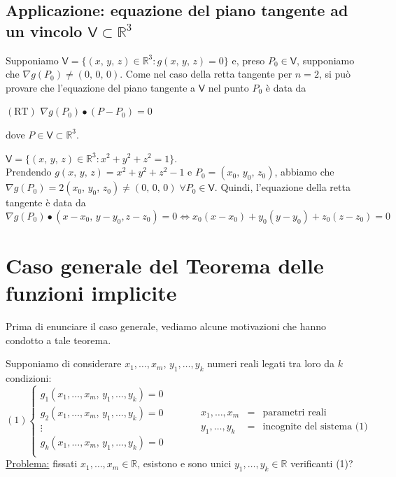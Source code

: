 \subsection{Applicazione: equazione del piano tangente ad un vincolo $\mathsf{V} \subset \mathbb{R}^3$}
Supponiamo $\mathsf{V} = \lbrace (x,\,y,\,z) \in \mathbb{R}^3 : g(x,\,y,\,z) = 0 \rbrace$ e, preso $P_0 \in \mathsf{V}$, supponiamo che $\nabla g(P_0) \neq (0,\,0,\,0)$. Come nel caso della retta tangente per $n=2$, si può provare che l'equazione del piano tangente a $\mathsf{V}$ nel punto $P_0$ è data da
\begin{center}
$\mathrm{(RT)}$
\hfill
$\displaystyle
\nabla g(P_0) \bullet (P-P_0) = 0
$
\hfill \null \\
\end{center}
dove $P \in \mathsf{V} \subset \mathbb{R}^3$. 

\begin{example}
$\mathsf{V} = \lbrace (x,\,y,\,z) \in \mathbb{R}^3 : x^2 + y^2 + z^2 = 1 \rbrace$.\\
Prendendo $g(x,\,y,\,z) = x^2 + y^2 + z^2 - 1$ e $P_0 = (x_0,\,y_0,\,z_0)$, abbiamo che $\nabla g(P_0) = 2(x_0,\,y_0,\,z_0) \neq (0,\,0,\,0) \; \forall P_0 \in \mathsf{V}$. Quindi, l'equazione della retta tangente è data da
$$
\nabla g(P_0) \bullet (x-x_0,\,y-y_0,z-z_0) = 0 \Longleftrightarrow x_0(x-x_0) + y_0(y-y_0) + z_0(z-z_0) = 0 
$$
\end{example}


\section{Caso generale del Teorema delle funzioni implicite}
Prima di enunciare il caso generale, vediamo alcune motivazioni che hanno condotto a tale teorema.

Supponiamo di considerare $x_1,\ldots,x_m,\,y_1,\ldots,y_k$ numeri reali legati tra loro da $k$ condizioni:
$$
\mathrm{(1)}
\begin{cases}
g_1(x_1,\ldots,x_m,\,y_1,\ldots,y_k) = 0\\
g_2(x_1,\ldots,x_m,\,y_1,\ldots,y_k) = 0\\
\vdots\\
g_k(x_1,\ldots,x_m,\,y_1,\ldots,y_k) = 0\\
\end{cases}
\qquad\quad
\begin{array}{lcl}
x_1,\ldots,x_m &=& \text{parametri reali}\\
y_1,\ldots,y_k &=& \text{incognite del sistema (1)}
\end{array}
$$
\underline{Problema:} fissati $x_1,\ldots,x_m \in \mathbb{R}$, esistono e sono unici $y_1,\ldots,y_k \in \mathbb{R}$ verificanti (1)?

